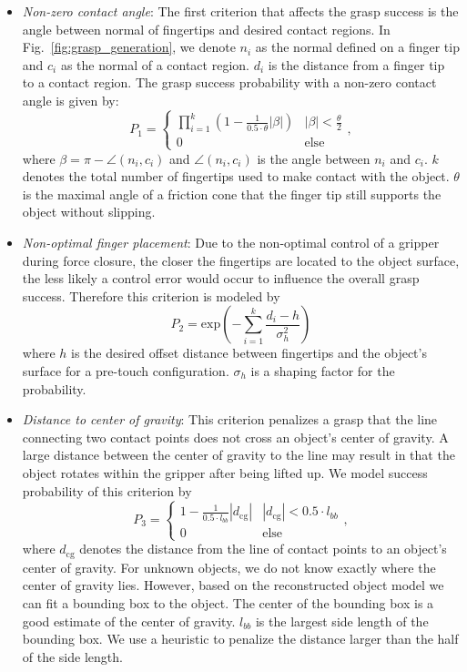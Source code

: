 \begin{itemize}
\item \textit{Non-zero contact angle}: 
 The first criterion that affects the grasp success is the angle between normal of fingertips and desired contact regions. In Fig.~\ref{fig:grasp_generation}, we denote $n_i$ as the normal defined on a finger tip and $c_i$ as the normal of a contact region. $d_i$ is the distance from a finger tip to a contact region. The grasp success probability with a non-zero contact angle is given by:
\begin{equation}
P_1 = \begin{cases}
\prod_{i=1}^{k}(1 -\frac{1}{0.5\cdot \theta} |\beta|)   & |\beta | < \frac{\theta}{2}\\
  0   & \text{else}
\end{cases},
\end{equation} 
where $\beta = \pi - \angle(n_i,c_i)$ and $\angle(n_i,c_i)$ is the angle between $n_i$ and $c_i$.  $k$ denotes the total number of fingertips used to make contact with the object. $\theta$ is the maximal angle of a friction cone that the finger tip still supports the object without slipping. 
\item \textit{Non-optimal finger placement}:
Due to the non-optimal control of a gripper during force closure, the closer the fingertips are located to the object surface, the less likely a control error would occur to influence the overall grasp success. Therefore this criterion is modeled by 
\begin{equation} 
P_2 = \text{exp}\left(-\sum_{i=1}^k \frac{d_i-h}{\sigma_h^2}\right)
\end{equation}
where $h$ is the desired offset distance between fingertips and the object's surface for a pre-touch configuration. $\sigma_h$ is a shaping factor for the probability. 

\item \textit{Distance to center of gravity}:
This criterion penalizes a grasp that the line connecting two contact points does not cross an object's center of gravity. A large distance between the center of gravity to the line may result in that the object rotates within the gripper after being lifted up.  We model success probability of this criterion by 
\begin{equation} 
P_3 = \begin{cases}
  1 -\frac{1}{ 0.5\cdot l_{bb} } |d_{\text{cg}}|      &  |d_{\text{cg}}|   < 0.5 \cdot l_{bb}  \\
  0   & \text{else}
\end{cases},
\end{equation}
where $d_{\text{cg}}$ denotes the distance from the line of contact points to an object's center of gravity. For unknown objects, we do not know  exactly where the center of gravity lies. However, based on the reconstructed object model we can fit a bounding box to the object. The center  of the bounding box is a good estimate of the center of gravity.  $l_{bb}$ is the largest side length of the bounding box. We use a heuristic to penalize the distance larger than the half of the side length. 


\end{itemize}
